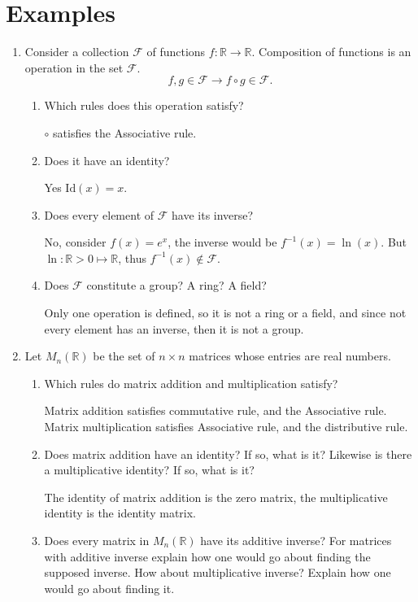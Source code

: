 \documentclass[10pt]{amsart}
\begin{document}
\section{Examples}%
\label{sec:examples}

\begin{enumerate}
  \item Consider a collection $\mathcal{F}$ of functions
    $f:\mathbb{R}\rightarrow\mathbb{R}$. Composition of functions is an
    operation in the set $\mathcal{F}$.  \[f,g\in\mathcal{F}\rightarrow f\circ
    g\in\mathcal{F}.\]
    \begin{enumerate}[listparindent=0.7cm]
      \item Which rules does this operation satisfy?

        $\circ$ satisfies the Associative rule.
      \item Does it have an identity?

        Yes $\text{Id}(x)=x$.
      \item Does every element of $\mathcal{F}$ have its inverse?

        No, consider $f(x)=e^x$, the inverse would be $f^{-1}(x)=\ln(x)$. But
        $\ln: \mathbb{R} > 0 \mapsto \mathbb{R}$, thus
        $f^{-1}(x)\notin\mathcal{F}$.
      \item Does $\mathcal{F}$ constitute a group? A ring? A field?

        Only one operation is defined, so it is not a ring or a field, and
        since not every element has an inverse, then it is not a group.
    \end{enumerate}
  \item Let $M_n(\mathbb{R})$ be the set of $n\times n$ matrices whose entries
    are real numbers.
    \begin{enumerate}[listparindent=0.7cm]
      \item Which rules do matrix addition and multiplication satisfy?

        Matrix addition satisfies commutative rule, and the Associative rule.
        Matrix multiplication satisfies Associative rule, and the distributive
        rule.
      \item Does matrix addition have an identity? If so, what is it? Likewise
        is there a multiplicative identity? If so, what is it?

        The identity of matrix addition is the zero matrix, the multiplicative
        identity is the identity matrix.
      \item Does every matrix in $M_n(\mathbb{R})$ have its additive inverse?
        For matrices with additive inverse explain how one would go about
        finding the supposed inverse. How about multiplicative inverse? Explain
        how one would go about finding it.


\end{enumerate}
\end{enumerate}
\end{document}
